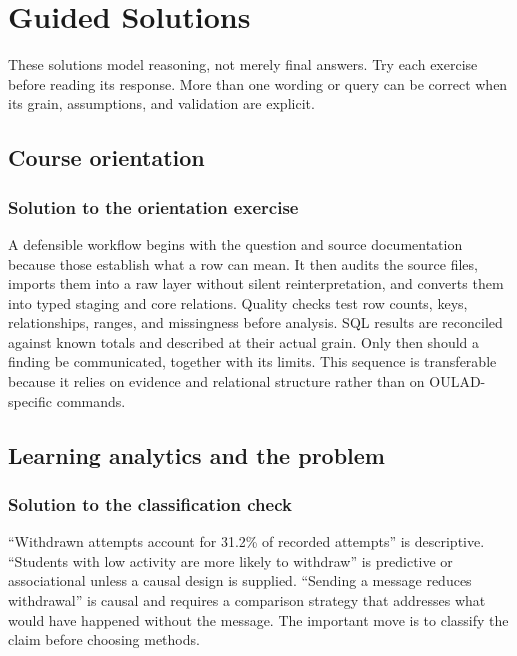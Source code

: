 \chapter{Guided Solutions}
\label{ch:guided-solutions}

\begin{plainlanguage}
These solutions model reasoning, not merely final answers. Try each exercise
before reading its response. More than one wording or query can be correct when
its grain, assumptions, and validation are explicit.
\end{plainlanguage}

\section{Course orientation}

\subsection{Solution to the orientation exercise}
\label{sol:orientation}

A defensible workflow begins with the question and source documentation because
those establish what a row can mean. It then audits the source files, imports
them into a raw layer without silent reinterpretation, and converts them into
typed staging and core relations. Quality checks test row counts, keys,
relationships, ranges, and missingness before analysis. SQL results are
reconciled against known totals and described at their actual grain. Only then
should a finding be communicated, together with its limits. This sequence is
transferable because it relies on evidence and relational structure rather than
on OULAD-specific commands.

\section{Learning analytics and the problem}

\subsection{Solution to the classification check}
\label{sol:learning-analytics}

``Withdrawn attempts account for 31.2\% of recorded attempts'' is descriptive.
``Students with low activity are more likely to withdraw'' is predictive or
associational unless a causal design is supplied. ``Sending a message reduces
withdrawal'' is causal and requires a comparison strategy that addresses what
would have happened without the message. The important move is to classify the
claim before choosing methods.

